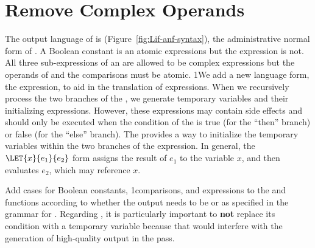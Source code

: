 \documentclass[7x10]{TimesAPriori_MIT}%
\def\pythonEd{1}
\def\edition{1}
\newcommand{\python}[1]{{\if\edition\pythonEd #1\fi}}
\begin{document}
\section{Remove Complex Operands}
\label{sec:remove-complex-opera-Lif}

The output language of  is
\LangIfANF{} (Figure~\ref{fig:Lif-anf-syntax}), the administrative
normal form of \LangIf{}.  A Boolean constant is an atomic expressions
but the  expression is not.  All three sub-expressions of an
 are allowed to be complex expressions but the operands of
 and the comparisons must be atomic.
%
\python{We add a new language form, the  expression, to aid
  in the translation of \code{if} expressions. When we recursively
  process the two branches of the \code{if}, we generate temporary
  variables and their initializing expressions. However, these
  expressions may contain side effects and should only be executed
  when the condition of the \code{if} is true (for the ``then''
  branch) or false (for the ``else'' branch). The \code{Let} provides
  a way to initialize the temporary variables within the two branches
  of the \code{if} expression.  In general, the $\LET{x}{e_1}{e_2}$
  form assigns the result of $e_1$ to the variable $x$, and then
  evaluates $e_2$, which may reference $x$.}

Add cases for Boolean constants, \python{comparisons,} and 
expressions to the  and  functions
according to whether the output needs to be \Exp{} or \Atm{} as
specified in the grammar for \LangIfANF{}.  Regarding , it is
particularly important to \textbf{not} replace its condition with a
temporary variable because that would interfere with the generation of
high-quality output in the  pass.


\newcommand{\LifASTMonadPython}{
\begin{array}{rcl}
\Atm &::=& \INT{\Int} \MID \VAR{\Var} \MID \BOOL{\itm{bool}}\\
\Exp &::=& \Atm \MID \READ{} \\
  &\MID& \BINOP{\itm{binaryop}}{\Atm}{\Atm} \MID \UNIOP{\key{unaryop}}{\Atm} \\
  &\MID& \CMP{\Atm}{\itm{cmp}}{\Atm} \MID \IF{\Exp}{\Exp}{\Exp} \\
  &\MID& \LET{\Var}{\Exp}{\Exp}\\
\Stmt{} &::=& \PRINT{\Atm} \MID \EXPR{\Exp} \\
        &\MID& \ASSIGN{\VAR{\Var}}{\Exp} \MID \IFSTMT{\Exp}{\Stmt^{*}}{\Stmt^{*}}\\
\LangIfANF  &::=& \PROGRAM{\code{()}}{\Stmt^{*}}
\end{array}
}
\end{document}
